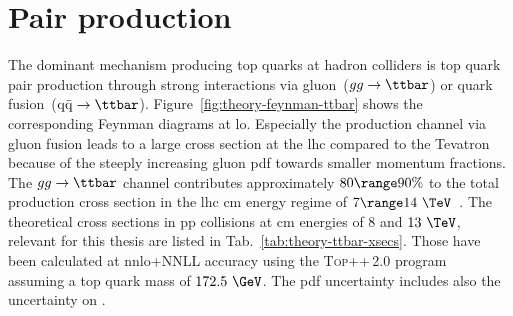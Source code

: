 \section{Pair production}
\label{sec:theory-ttbar-production}

The dominant mechanism producing top quarks at hadron colliders is top quark pair production through strong interactions via gluon~($gg\to\ttbar$) or quark fusion~($\mathrm{q}\bar{\mathrm{q}}\to\ttbar$). Figure~\ref{fig:theory-feynman-ttbar} shows the corresponding Feynman diagrams at \gls{lo}. Especially the production channel via gluon fusion leads to a large cross section at the \gls{lhc} compared to the Tevatron because of the steeply increasing gluon \gls{pdf} towards smaller momentum fractions. The $gg\to\ttbar$ channel contributes approximately $80\range90\%$ to the total \ttbar production cross section in the \gls{lhc} \acrlong{cm} energy regime of $7\range14~\TeV$~\cite{Olive:2016xmw}. The theoretical \ttbar cross sections in pp collisions at \acrlong{cm} energies of $8$ and $13~\TeV$, relevant for this thesis are listed in Tab.~\ref{tab:theory-ttbar-xsecs}. Those have been calculated at \gls{nnlo}+NNLL accuracy using the \textsc{Top++}\,2.0 program~\cite{Czakon:2011xx,Czakon:2013goa} assuming a top quark mass of $172.5~\GeV$. The \gls{pdf} uncertainty includes also the uncertainty on \as.

